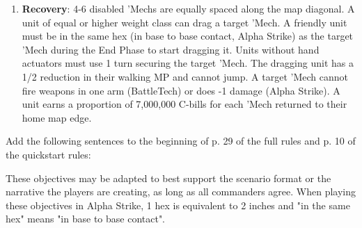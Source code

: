 \begin{enumerate}
\item {\bfseries Recovery}: 4-6 disabled 'Mechs are equally spaced along the map diagonal.
A unit of equal or higher weight class can drag a target 'Mech.
A friendly unit must be in the same hex (in base to base contact, Alpha Strike) as the target 'Mech during the End Phase to start dragging it.
Units without hand actuators must use 1 turn securing the target 'Mech.
The dragging unit has a 1/2 reduction in their walking MP and cannot jump.
A target 'Mech cannot fire weapons in one arm (BattleTech) or does -1 damage (Alpha Strike).
A unit earns a proportion of 7,000,000 C-bills for each 'Mech returned to their home map edge.

\end{enumerate}

Add the following sentences to the beginning of p. 29 of the full rules and p. 10 of the quickstart rules:

These objectives may be adapted to best support the scenario format or the narrative the players are creating, as long as all commanders agree.
When playing these objectives in Alpha Strike, 1 hex is equivalent to 2 inches and "in the same hex" means "in base to base contact".
